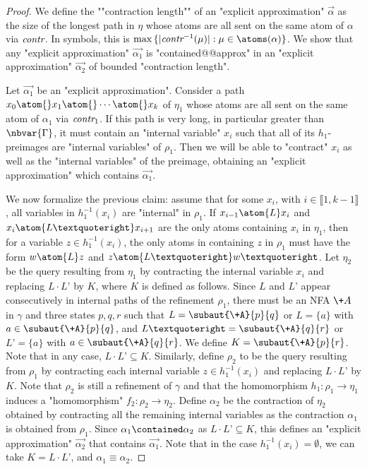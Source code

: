 \begin{proof}
	We define the \AP""contraction length"" of an "explicit approximation" $\vec{\alpha}$
	as the size of the longest path in $\eta$ whose atoms are all sent on the same
	atom of $\alpha$ via $\textit{contr}$. In symbols, this is $\max{\set{|\cont^{-1}(\mu)| : \mu \in \atoms(\alpha)}}$.
	We show that any "explicit approximation" $\vec{\alpha_1}$ is "contained@@approx"
	in an "explicit approximation" $\vec{\alpha_2}$ of bounded "contraction length".

	Let $\vec{\alpha_1}$ be an "explicit approximation".
	Consider a path $x_0 \atom{} x_1 \atom{} \cdots \atom{} x_k$ of $\eta_1$ whose
	atoms are all sent on the same atom of $\alpha_1$ via $\textit{contr}_1$. 
	If this path is very long, in particular greater than $\nbvar{\Gamma}$, it must contain an "internal variable" $x_i$ such that all of its $h_1$-preimages are "internal variables" of $\rho_1$. 
	Then we will be able to "contract" $x_i$ as well as the "internal variables" of the preimage, obtaining an "explicit approximation" which contains $\vec{\alpha_1}$.

	We now formalize the previous claim: assume that for some $x_i$, with $i\in \lBrack 1,k-1\rBrack$, all variables in $h_1^{-1}(x_i)$ are "internal" in $\rho_1$. If $x_{i-1}\atom{L} x_i$ and $x_i\atom{L’} x_{i+1}$ are the only atoms containing $x_i$ in $\eta_1$, then for a variable $z\in h_1^{-1}(x_i)$, the only atoms in  containing $z$ in $\rho_1$ must have the form $w\atom{L} z$ and $z\atom{L’} w’$. Let $\eta_2$ be the query resulting from $\eta_1$ by contracting the internal variable $x_i$ and replacing $L\cdot L’$ by $K$, where $K$ is defined as follows. Since $L$ and $L’$ appear consecutively in internal paths of the refinement $\rho_1$, there must be an  NFA $\+A$ in $\gamma$ and three states $p,q,r$ such that $L=\subaut{\+A}{p}{q}$ or $L=\{a\}$ with $a\in \subaut{\+A}{p}{q}$, and   $L’=\subaut{\+A}{q}{r}$ or $L’=\{a\}$ with $a\in \subaut{\+A}{q}{r}$. We define $K=\subaut{\+A}{p}{r}$. Note that in any case, $L\cdot L’\subseteq K$. Similarly, define $\rho_2$ to be the query resulting from $\rho_1$ by contracting each internal variable $z\in h_1^{-1}(x_i)$ and replacing $L\cdot L’$ by $K$. Note that $\rho_2$ is still a refinement of $\gamma$ and that the homomorphism  $h_1\colon \rho_1 \to \eta_1$ induces a "homomorphism" $f_2\colon \rho_2 \to \eta_2$. Define $\alpha_2$ be the contraction of $\eta_2$ obtained by contracting all the remaining internal variables as  the contraction $\alpha_1$ is obtained from  $\rho_1$. Since $\alpha_1\contained \alpha_2$ as $L\cdot L’\subseteq K$, this defines an  "explicit approximation" $\vec{\alpha_2}$ that contains $\vec{\alpha_1}$. Note that in the case $h_1^{-1}(x_i)=\emptyset$, we can take $K=L\cdot L’$, and $\alpha_1\equiv \alpha_2$.


\end{proof}

